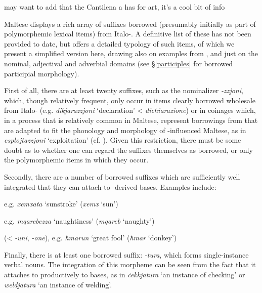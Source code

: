 \documentclass[output=paper]{langsci/langscibook}
\begin{document}
may want to add that the Cantilena a has  for art, it's a cool bit of info

\largerpage
Maltese displays a rich array of  suffixes borrowed (presumably initially as part of polymorphemic lexical items) from Italo-. A definitive list of these has not been provided to date, but \cite{Saade2019} offers a detailed typology of such items, of which we present a simplified version here, drawing also on examples from \cite{brincatmifsud2015}, and  just on the nominal, adjectival and adverbial domains (see §\ref{participles} for borrowed participial morphology).


First of all, there are at least twenty suffixes, such as the nominalizer \textit{-zzjoni}, which, though relatively frequent, only occur in items clearly borrowed wholesale from Italo- (e.g. \textit{dikjarazzjoni} `declaration' <  \textit{dichiarazione}) or in coinages which, in a process that is relatively common in Maltese, represent borrowings from  that are adapted to fit the phonology and morphology of -influenced Maltese, as in \textit{esplojtazzjoni} `exploitation' (cf. \citealt{gattfabri2018}). Given this restriction, there must be some doubt as to whether one can regard the suffixes themselves as borrowed, or only the polymorphemic items in which they occur.

Secondly, there are a number of borrowed suffixes which are sufficiently well integrated that they can attach to -derived bases. Examples include:

\begin{description}[font=\normalfont,noitemsep,labelsep=\widthof{~}]
	\item[\textit{-ata},] e.g. \textit{xemxata} `sunstroke' (\textit{xemx} `sun')
    \item[\textit{-ezza},] e.g. \textit{mqarebezza} `naughtiness' (\textit{mqareb} `naughty')
    \item[\textit{-un}] (<  \textit{-uni},  \textit{-one}), e.g. \textit{ħmarun} `great fool' (\textit{ħmar} `donkey')
\end{description}


Finally, there is at least one borrowed suffix: \textit{-tura}, which forms single-instance verbal nouns. The integration of this morpheme can be seen from the fact that it attaches to productively to  bases, as in \textit{ċekkjatura} `an instance of checking' or \textit{weldjatura} `an instance of welding'.
\end{document}
